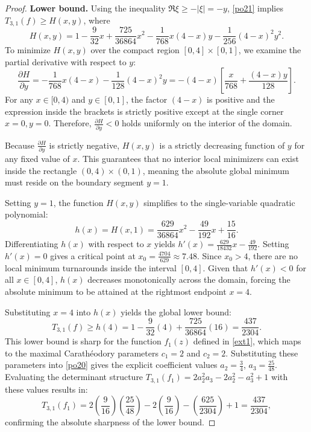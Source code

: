 \documentclass[10pt,a4paper]{amsart}
\numberwithin{equation}{section}
\begin{document}
\begin{proof}
\medskip
\noindent\textbf{Lower bound.}
Using the inequality $\Re\xi \ge -|\xi| = -y$, \eqref{po21} implies $T_{3,1}(f) \ge H(x,y)$, where
\[
H(x,y) = 1 - \frac{9}{32}x + \frac{725}{36864}x^2 - \frac{1}{768}x(4-x)y - \frac{1}{256}(4-x)^2y^2.
\]
To minimize $H(x,y)$ over the compact region $[0,4] \times [0,1]$, we examine the partial derivative with respect to $y$:
\[
\frac{\partial H}{\partial y} = -\frac{1}{768}x(4-x) - \frac{1}{128}(4-x)^2y = -(4-x)\left[ \frac{x}{768} + \frac{(4-x)y}{128} \right].
\]
For any $x \in [0,4)$ and $y \in [0,1]$, the factor $(4-x)$ is positive and the expression inside the brackets is strictly positive except at the single corner $x=0, y=0$. Therefore, $\frac{\partial H}{\partial y} < 0$ holds uniformly on the interior of the domain. 

Because $\frac{\partial H}{\partial y}$ is strictly negative, $H(x,y)$ is a strictly decreasing function of $y$ for any fixed value of $x$. This guarantees that no interior local minimizers can exist inside the rectangle $(0,4) \times (0,1)$, meaning the absolute global minimum must reside on the boundary segment $y = 1$.

Setting $y = 1$, the function $H(x,y)$ simplifies to the single-variable quadratic polynomial:
\[
h(x) = H(x,1) = \frac{629}{36864}x^2 - \frac{49}{192}x + \frac{15}{16}.
\]
Differentiating $h(x)$ with respect to $x$ yields $h'(x) = \frac{629}{18432}x - \frac{49}{192}$. Setting $h'(x) = 0$ gives a critical point at $x_0 = \frac{4704}{629} \approx 7.48$. Since $x_0 > 4$, there are no local minimum turnarounds inside the interval $[0,4]$. Given that $h'(x) < 0$ for all $x \in [0,4]$, $h(x)$ decreases monotonically across the domain, forcing the absolute minimum to be attained at the rightmost endpoint $x = 4$.

Substituting $x = 4$ into $h(x)$ yields the global lower bound:
\[
T_{3,1}(f) \ge h(4) = 1 - \frac{9}{32}(4) + \frac{725}{36864}(16) = \frac{437}{2304}.
\]
This lower bound is sharp for the function $f_1(z)$ defined in \eqref{ext1}, which maps to the maximal Carath\'{e}odory parameters $c_1=2$ and $c_2=2$. Substituting these parameters into \eqref{po20} gives the explicit coefficient values $a_2 = \frac{3}{4}$, $a_3 = \frac{25}{48}$. Evaluating the determinant structure $T_{3,1}(f_1) = 2 a_2^2 a_3 - 2 a_2^2 - a_3^2 + 1$ with these values results in:
\[
T_{3,1}(f_1) = 2\left(\frac{9}{16}\right)\left(\frac{25}{48}\right) - 2\left(\frac{9}{16}\right) - \left(\frac{625}{2304}\right) + 1 = \frac{437}{2304},
\]
confirming the absolute sharpness of the lower bound.
\end{proof}
\end{document}
